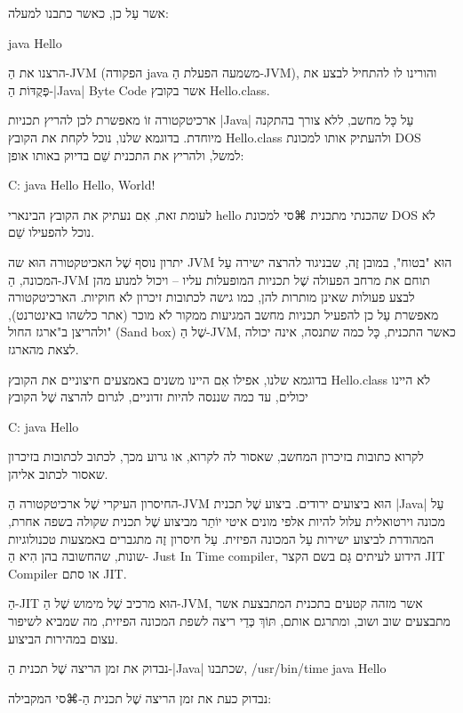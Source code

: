 אשר עַל כן, כאשר כתבנו למעלה:

java Hello
\END

הרצנו את הַ-JVM (הפקודה java משמעה הפעלת הַ-JVM), והורינו לו להתחיל לבצע
את פְּקֻדּוֹת הַ-|Java| Byte Code אשר בקובץ Hello.class.

ארכיטקטורה זוֹ מאפשרת לכן להריץ תכניות \E|Java| עַל כָּל מחשב, ללא צורך בהתקנה
מיוחדת. בדוגמא שלנו, נוכל לקחת את הקובץ Hello.class ולהעתיק אותו למכונת DOS
למשל, ולהריץ את התכנית שֵׁם בדיוק באותו אופן:

\begin{NONE}
C:\> java Hello
Hello, World!
\end{NONE}

לעומת זאת, אִם נעתיק את הקובץ הבינארי hello שהכנתי מתכנית ⌘סי למכונת DOS לֹא
נוכל להפעילו שֵׁם.

יתרון נוסף שֶׁל האכיטקטורה הוּא שה JVM הוּא "בטוח", במובן זֶה, שבניגוד להרצה
ישירה עַל המכונה, הַ-JVM תוחם את מרחב הפעולה שֶׁל תכניות המופעלות עליו –
ויכול למנוע מהן לבצע פעולות שאינן מותרות להן, כמו גישה לכתובות זיכרון לֹא
חוקיות. הארכיטקטורה מאפשרת עַל כן להפעיל תכניות מחשב המגיעות ממקור לֹא
מוכר (אתר כלשהו באינטרנט), ולהריצן ב"ארגז החול" (Sand box) שֶׁל הַ-JVM, כאשר
התכנית, כָּל כמה שתנסה, אינה יכולה לצאת מהארגז.

בדוגמא שלנו, אפילו אִם היינו משנים באמצעים חיצוניים את הקובץ Hello.class לֹא
היינו יכולים, עד כמה שננסה להיות זדוניים, לגרום להרצה שֶׁל הקובץ
\begin{NONE}
C:\> java Hello
\end{NONE}

לקרוא כתובות בזיכרון המחשב, שאסור לה לקרוא, או גרוע מכך, לכתוב לכתובות בזיכרון
שאסור לכתוב אליהן.

החיסרון העיקרי שֶׁל ארכיטקטורה הַ-JVM הוּא ביצועים ירודים. ביצוע שֶׁל תכנית
|Java| עַל מכונה וירטואלית עלול להיות אלפי מונים איטי יוֹתֵר מביצוע שֶׁל
תכנית שקולה בשפה אחרת, המהודרת לביצוע ישירות עַל המכונה הפיזית. עַל חיסרון
זֶה מתגברים באמצעות טכנולוגיות שונות, שהחשובה בהן הִיא הַ- Just In Time
compiler, הידוע לעיתים גַּם בשם הקצר JIT Compiler או סתם JIT.

הַ-JIT הוּא מרכיב שֶׁל מימוש שֶׁל הַ-JVM, אשר מזהה קטעים בתכנית המתבצעת
אשר מתבצעים שוב ושוב, ומתרגם אותם, תּוֹךְ כְּדֵי ריצה לשפת המכונה הפיזית, מה
שמביא לשיפור עצום במהירות הביצוע.

נבדוק את זמן הריצה שֶׁל תכנית הַ-|Java| שכתבנו,
/usr/bin/time java Hello
\END

נבדוק כעת את זמן הריצה שֶׁל תכנית הַ-⌘סי המקבילה:

